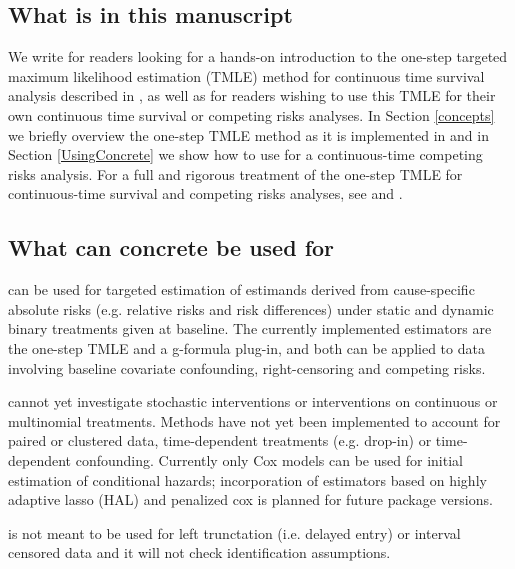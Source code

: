 \documentclass{report}
\newcommand{\1}{\ensuremath{\mathbf{1}}}
\begin{document}
\subsection{What is in this manuscript}
\label{sec:orgd280fdf}
We write for readers looking for a hands-on introduction to the one-step targeted maximum likelihood estimation (TMLE) method for continuous time survival analysis described in \cite{rytgaard_one-step_2021}, as well as for readers
wishing to use this TMLE for their own continuous time survival or competing risks analyses. In Section \ref{concepts} we briefly overview the one-step TMLE method as it is implemented in 
and in Section \ref{UsingConcrete} we show how to use  for a continuous-time competing risks analysis. For a full and rigorous treatment of the one-step TMLE for continuous-time survival and competing risks analyses, see \cite{rytgaard_one-step_2021} and \cite{rytgaard_continuous-time_2021}.

\subsection{What can concrete be used for}
\label{sec:orgea8f43d}
 can be used for targeted estimation of estimands derived from cause-specific absolute risks (e.g. relative risks and risk differences) under static and dynamic binary treatments given at baseline. The currently implemented estimators are the one-step TMLE and a g-formula plug-in, and both can be applied to data involving baseline covariate confounding, right-censoring and competing risks.

 cannot yet investigate stochastic interventions or interventions on continuous or multinomial treatments. Methods have not yet been implemented to account for paired or clustered data, time-dependent treatments (e.g. drop-in) or time-dependent confounding. Currently only Cox models can be used for initial estimation of conditional hazards; incorporation of estimators based on highly adaptive lasso (HAL) and penalized cox is planned for future package versions.

 is not meant to be used for left trunctation (i.e. delayed entry) or interval censored data and it will not check identification assumptions. 
\end{document}
